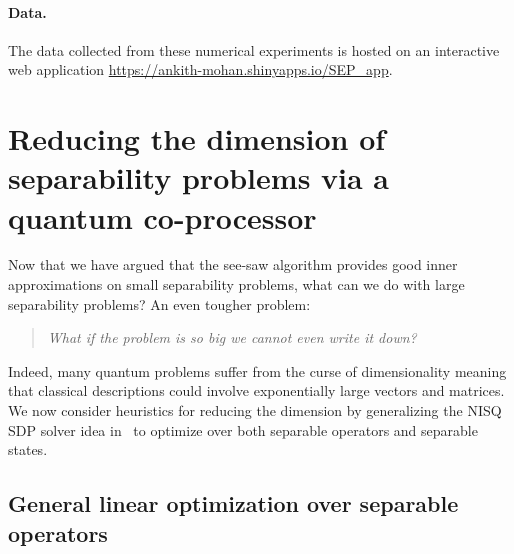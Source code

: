 \paragraph{Data.}   
The data collected from these numerical experiments is hosted on an interactive web application \url{https://ankith-mohan.shinyapps.io/SEP_app}. 
      
\section{Reducing the dimension of separability problems via a quantum co-processor}\label{sec:ch2_SEP-big_sep} 

Now that we have argued that the see-saw algorithm provides good inner approximations on small separability problems, what can we do with large separability problems? 
An even tougher problem: 
\begin{quote} 
\centering
\textit{What if the problem is so big we cannot even write it down? }
\end{quote} 
Indeed, many quantum problems suffer from the curse of dimensionality meaning that classical descriptions could involve exponentially large vectors and matrices. 
We now consider heuristics for reducing the dimension by generalizing the NISQ SDP solver idea in~\cite{bharti2022noisy} to optimize over both separable operators and separable states.   

 
\subsection{General linear optimization over separable operators} \label{ss:ch2_SEP-sep_ops}

